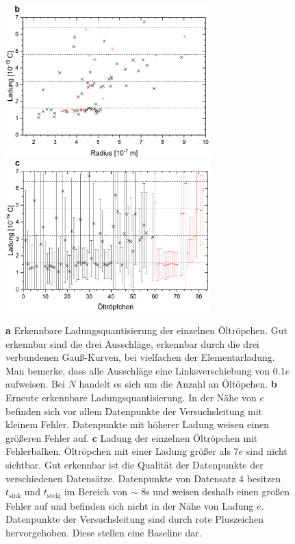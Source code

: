 \documentclass[a4paper,usenatbib]{aspdoc}
\begin{document}
\begin{figure}
                \includegraphics[width=79mm]{graphs/chargeToRad1Clean.png}
                \includegraphics[width=79mm]{graphs/chargeToRadNum.png}
                \caption{\textbf{a} Erkennbare Ladungsquantisierung der einzelnen Öltröpchen. Gut erkennbar sind die drei Ausschläge, erkennbar durch die drei verbundenen Gauß-Kurven, bei vielfachen der Elementarladung. Man bemerke, dass alle Ausschläge eine Linksverschiebung von $0.1 e$ aufweisen. Bei $N$ handelt es sich um die Anzahl an Öltöpchen.
                \textbf{b} Erneute erkennbare Ladungsquantisierung. In der Nähe von $e$ befinden sich vor allem Datenpunkte der Versuchsleitung mit kleinem Fehler. Datenpunkte mit höherer Ladung weisen einen größeren Fehler auf. 
                \textbf{c} Ladung der einzelnen Öltröpchen mit Fehlerbalken. Öltröpchen mit einer Ladung größer als $7e$ sind nicht sichtbar. Gut erkennbar ist die Qualität der Datenpunkte der verschiedenen Datensätze. Datenpunkte von Datensatz 4 besitzen $t_{\mathrm{sink}}$ und $t_{\mathrm{steig}}$ im Bereich von $\sim$ 8s und weisen deshalb einen großen Fehler auf und befinden sich nicht in der Nähe von Ladung $e$.\\
                Datenpunkte der Versuchsleitung sind durch rote Pluszeichen hervorgehoben. Diese stellen eine Baseline dar.}
                \label{fig:cToRad}
            \end{figure}
            
\end{document}
